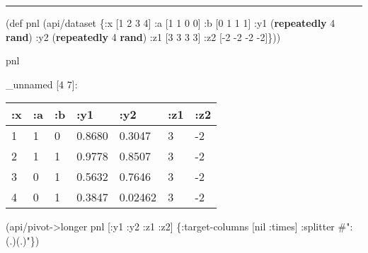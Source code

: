 \documentclass[]{article}
\newenvironment{Shaded}{\begin{snugshade}}{\end{snugshade}}
\newcommand{\KeywordTok}[1]{\textcolor[rgb]{0.13,0.29,0.53}{\textbf{#1}}}
\newcommand{\DecValTok}[1]{\textcolor[rgb]{0.00,0.00,0.81}{#1}}
\newcommand{\SpecialStringTok}[1]{\textcolor[rgb]{0.31,0.60,0.02}{#1}}
\newcommand{\FunctionTok}[1]{\textcolor[rgb]{0.00,0.00,0.00}{#1}}
\newcommand{\VariableTok}[1]{\textcolor[rgb]{0.00,0.00,0.00}{#1}}
\newcommand{\BuiltInTok}[1]{#1}
\newcommand{\AttributeTok}[1]{\textcolor[rgb]{0.77,0.63,0.00}{#1}}
\newcommand{\NormalTok}[1]{#1}
\begin{document}
\begin{center}\rule{0.5\linewidth}{0.5pt}\end{center}

\begin{Shaded}
\begin{Highlighting}[]
\NormalTok{(}\BuiltInTok{def}\FunctionTok{ pnl }\NormalTok{(api/dataset \{}\AttributeTok{:x}\NormalTok{ [}\DecValTok{1} \DecValTok{2} \DecValTok{3} \DecValTok{4}\NormalTok{]}
                       \AttributeTok{:a}\NormalTok{ [}\DecValTok{1} \DecValTok{1} \DecValTok{0} \DecValTok{0}\NormalTok{]}
                       \AttributeTok{:b}\NormalTok{ [}\DecValTok{0} \DecValTok{1} \DecValTok{1} \DecValTok{1}\NormalTok{]}
                       \AttributeTok{:y1}\NormalTok{ (}\KeywordTok{repeatedly} \DecValTok{4} \KeywordTok{rand}\NormalTok{)}
                       \AttributeTok{:y2}\NormalTok{ (}\KeywordTok{repeatedly} \DecValTok{4} \KeywordTok{rand}\NormalTok{)}
                       \AttributeTok{:z1}\NormalTok{ [}\DecValTok{3} \DecValTok{3} \DecValTok{3} \DecValTok{3}\NormalTok{]}
                       \AttributeTok{:z2}\NormalTok{ [-}\DecValTok{2} \DecValTok{-2} \DecValTok{-2} \DecValTok{-2}\NormalTok{]\}))}
\end{Highlighting}
\end{Shaded}

\begin{Shaded}
\begin{Highlighting}[]
\NormalTok{pnl}
\end{Highlighting}
\end{Shaded}

\_unnamed {[}4 7{]}:

\begin{longtable}[]{@{}lllllll@{}}
\toprule
:x & :a & :b & :y1 & :y2 & :z1 & :z2\tabularnewline
\midrule
\endhead
1 & 1 & 0 & 0.8680 & 0.3047 & 3 & -2\tabularnewline
2 & 1 & 1 & 0.9778 & 0.8507 & 3 & -2\tabularnewline
3 & 0 & 1 & 0.5632 & 0.7646 & 3 & -2\tabularnewline
4 & 0 & 1 & 0.3847 & 0.02462 & 3 & -2\tabularnewline
\bottomrule
\end{longtable}

\begin{Shaded}
\begin{Highlighting}[]
\NormalTok{(api/pivot->longer pnl [}\AttributeTok{:y1} \AttributeTok{:y2} \AttributeTok{:z1} \AttributeTok{:z2}\NormalTok{] \{}\AttributeTok{:target-columns}\NormalTok{ [}\VariableTok{nil} \AttributeTok{:times}\NormalTok{]}
                                          \AttributeTok{:splitter} \SpecialStringTok{#":(.)(.)"}\NormalTok{\})}
\end{Highlighting}
\end{Shaded}
\end{document}
